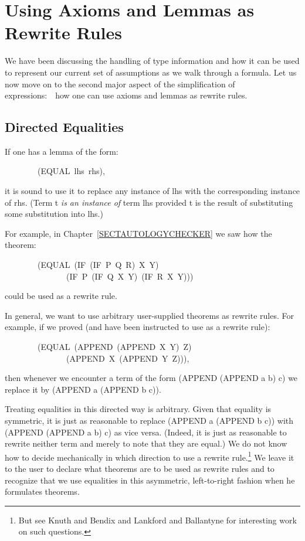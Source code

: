 \documentclass[10pt]{book}
\newenvironment{pubasis}{\begin{flushleft}}{\end{flushleft}}
\begin{document}
\chapter{Using Axioms and Lemmas as Rewrite Rules}
\pagestyle{headings}
\label{SECREWRITERULES}
We have been discussing the handling of type information and how
it can be used to represent our current set of assumptions as we
walk through a formula.
Let us now move on to the second major aspect of the simplification
of expressions:~~how one can use axioms and lemmas as rewrite rules.

\section{Directed Equalities}
If one has a lemma of the form:

\begin{pubasis}
~~~~~~~~(EQUAL~lhs~rhs),\\
\end{pubasis}
it is sound to use it to replace any instance of lhs with the
corresponding instance of rhs.
(Term t \emph{is an instance of} term lhs provided t is the result of
substituting some substitution into lhs.)

For example, in Chapter~\ref{SECTAUTOLOGYCHECKER} we saw how the theorem:

\begin{pubasis}
~~~~~~~~(EQUAL~(IF~(IF~P~Q~R)~X~Y)\\
~~~~~~~~~~~~~~~(IF~P~(IF~Q~X~Y)~(IF~R~X~Y)))\\
\end{pubasis}
could be used as a rewrite rule.

In general, we want to use arbitrary user-supplied theorems
as rewrite rules.
For example, if we proved (and have been instructed to
use as a rewrite rule):
\begin{pubasis}
~~~~~~~~(EQUAL~(APPEND~(APPEND~X~Y)~Z)\\
~~~~~~~~~~~~~~~(APPEND~X~(APPEND~Y~Z))),\\
\end{pubasis}
then whenever we encounter a term of the form
(APPEND (APPEND a b) c) we replace it by (APPEND a (APPEND b c)).

Treating equalities in this directed way is arbitrary.
Given that equality is symmetric, it is just as reasonable to replace
(APPEND a (APPEND b c)) with (APPEND (APPEND a b) c)
as vice versa.
(Indeed, it is
just as reasonable to rewrite neither term and merely to note
that they are equal.)  We do not know how to
decide mechanically in which direction
to use a rewrite rule.\footnote{But see Knuth and Bendix \cite{KNUTHBENDIX} and  Lankford and Ballantyne \cite{BALLANTYNE} for interesting work on such questions.}  We leave it to the user to declare what 
theorems are to be used as rewrite rules and to recognize that we
use equalities in this asymmetric, left-to-right fashion when he
formulates theorems.
\end{document}
